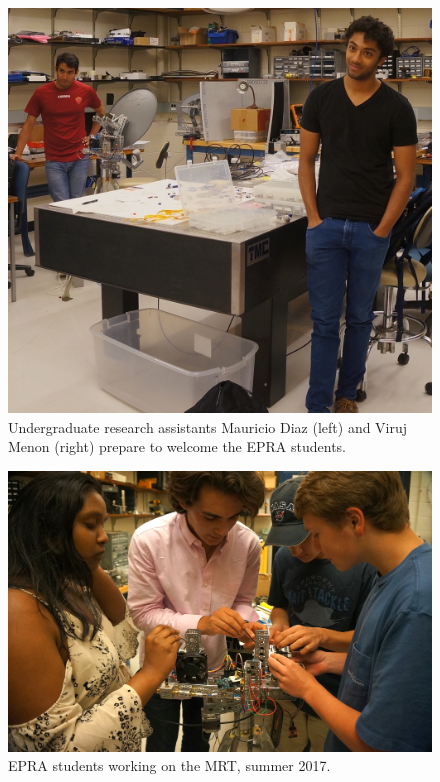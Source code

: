 \documentclass[11pt,letterpaper]{spie}
\begin{document}
\begin{figure}[h]
\centering
\includegraphics[width=6.5in]{DiazAndMenon.jpg}
\vspace{5pt}
\caption{Undergraduate research assistants Mauricio Diaz (left) and Viruj Menon (right) prepare to welcome the EPRA students.}
\label{fig:Devices}
\end{figure}

\begin{figure}[h]
\centering
\includegraphics[width=6.5in]{EPRA_working.jpg}
\vspace{5pt}
\caption{EPRA students working on the MRT, summer 2017.}
\label{fig:Devices}
\end{figure}
\end{document}
